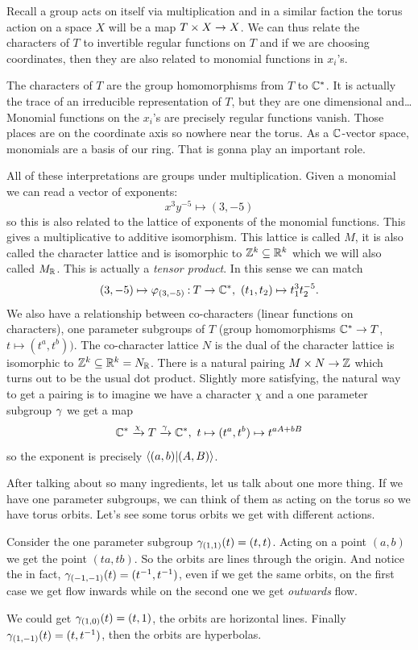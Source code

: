 \documentclass[12pt]{memoir}
\begin{document}
Recall a group acts on itself via multiplication and in a similar faction the torus action on a space $X$ will be a map $T\times X\to X$. We can thus relate the characters of $T$ to invertible regular functions on $T$ and if we are choosing coordinates, then they are also related to monomial functions in $x_i$'s.\par 
The characters of $T$ are the group homomorphisms from $T$ to $\mathbb{C}^\ast$. It is actually the trace of an irreducible representation of $T$, but they are one dimensional and\dots Monomial functions on the $x_i$'s are precisely regular functions vanish. Those places are on the coordinate axis so nowhere near the torus. As a $\mathbb{C}$-vector space, monomials are a basis of our ring. That is gonna play an important role.\par 
All of these interpretations are groups under multiplication. Given a monomial we can read a vector of exponents: 
$$x^3y^{-5}\mapsto (3,-5)$$
so this is also related to the lattice of exponents of the monomial functions. This gives a multiplicative to additive isomorphism. This lattice is called $M$, it is also called the character lattice and is isomorphic to $\mathbb{Z}^k\subseteq \mathbb{R}^k$ which we will also called $M_{\mathbb{R}}$. This is actually a \emph{tensor product}. In this sense we can match 
$$(3,-5)\mapsto \vf_{(3,-5)}\: T\to\bC^\ast,\ (t_1,t_2)\mapsto t_1^3t_2^{-5}.$$
We also have a relationship between co-characters (linear functions on characters), one parameter subgroups of $T$ (group homomorphisms $\mathbb{C}^\ast\to T$, $t\mapsto(t^a,t^b))$. The co-character lattice $N$ is the dual of the character lattice is isomorphic to $\mathbb{Z}^k\subseteq\mathbb{R}^k=N_{\mathbb{R}}$. There is a natural pairing $M\times N\to\mathbb{Z}$ which turns out to be the usual dot product. Slightly more satisfying, the natural way to get a pairing is to imagine we have a character $\chi$ and a one parameter subgroup $\gamma$ we get a map 
$$\bC^\ast\xrightarrow[]{\chi}T\xrightarrow[]{\ga}\bC^\ast,\ t\mapsto(t^a,t^b)\mapsto t^{aA+bB}$$
so the exponent is precisely $\braket{(a,b)}{(A,B)}$.\par
After talking about so many ingredients, let us talk about one more thing. If we have one parameter subgroups, we can think of them as acting on the torus so we have torus orbits. Let's see some torus orbits we get with different actions. 

\begin{Ex}
    Consider the one parameter subgroup $\gamma_{(1,1)}(t)=(t,t)$. Acting on a point $(a,b)$ we get the point $(ta,tb)$. So the orbits are lines through the origin. And notice the in fact, $\gamma_{(-1,-1)}(t)=(t^{-1},t^{-1})$, even if we get the same orbits, on the first case we get flow inwards while on the second one we get \emph{outwards} flow.\par 
    We could get $\gamma_{(1,0)}(t)=(t,1)$, the orbits are horizontal lines. Finally $\gamma_{(1,-1)}(t)=(t,t^{-1})$, then the orbits are hyperbolas. 
\end{Ex}
\end{document}
